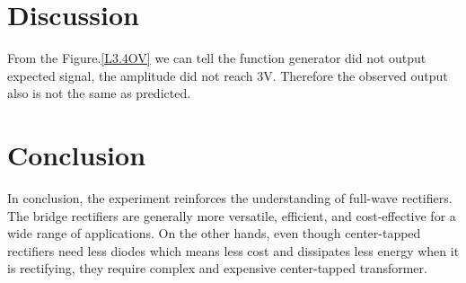 \section{Discussion}
From the Figure.\ref{L3.4OV} we can tell the function generator did not output expected signal, the amplitude did not reach 3V. Therefore the observed output also is not the same as predicted.

\section{Conclusion}
In conclusion, the experiment reinforces the understanding of full-wave rectifiers. The bridge rectifiers are generally more versatile, efficient, and cost-effective for a wide range of applications. On the other hands, even though center-tapped rectifiers need less diodes which means less cost and dissipates less energy when it is rectifying, they require complex and expensive center-tapped transformer.